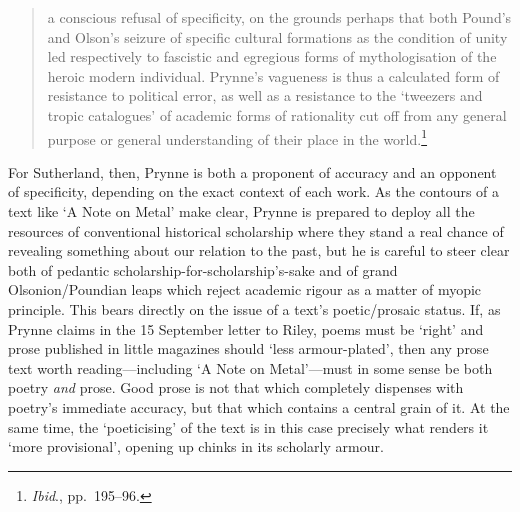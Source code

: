 \documentclass[]{article}
\begin{document}
\begin{quote}
a conscious refusal of specificity, on the grounds perhaps that both
Pound's and Olson's seizure of specific cultural formations as the
condition of unity led respectively to fascistic and egregious forms of
mythologisation of the heroic modern individual. Prynne's vagueness is
thus a calculated form of resistance to political error, as well as a
resistance to the `tweezers and tropic catalogues' of academic forms of
rationality cut off from any general purpose or general understanding of
their place in the world.\footnote{\emph{Ibid}., pp.~195--96.}
\end{quote}

\noindent For Sutherland, then, Prynne is both a proponent of accuracy
and an opponent of specificity, depending on the exact context of each
work. As the contours of a text like `A Note on Metal' make clear,
Prynne is prepared to deploy all the resources of conventional
historical scholarship where they stand a real chance of revealing
something about our relation to the past, but he is careful to steer
clear both of pedantic scholarship-for-scholarship's-sake and of grand
Olsonion/Poundian leaps which reject academic rigour as a matter of
myopic principle. This bears directly on the issue of a text's
poetic/prosaic status. If, as Prynne claims in the 15 September letter
to Riley, poems must be `right' and prose published in little magazines
should `less armour-plated', then any prose text worth
reading---including `A Note on Metal'---must in some sense be both
poetry \emph{and} prose. Good prose is not that which completely
dispenses with poetry's immediate accuracy, but that which contains a
central grain of it. At the same time, the `poeticising' of the text is
in this case precisely what renders it `more provisional', opening up
chinks in its scholarly armour.
\end{document}
